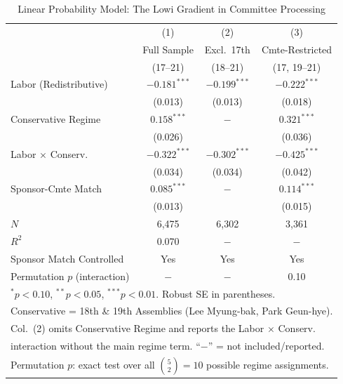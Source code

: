 \documentclass[11pt]{article}
\begin{document}
\begin{table}[H]
\centering
\caption{Linear Probability Model: The Lowi Gradient in Committee Processing}
\label{tab:main}
\begin{tabular}{lccc}
\toprule
 & (1) & (2) & (3) \\
 & Full Sample & Excl.\ 17th & Cmte-Restricted \\
 & (17--21) & (18--21) & (17, 19--21) \\
\midrule
Labor (Redistributive)  & $-0.181^{***}$ & $-0.199^{***}$ & $-0.222^{***}$ \\
                         & (0.013)        & (0.013)        & (0.018)        \\[4pt]
Conservative Regime      & $0.158^{***}$  & $-$            & $0.321^{***}$  \\
                         & (0.026)        &                & (0.036)        \\[4pt]
Labor $\times$ Conserv.  & $-0.322^{***}$ & $-0.302^{***}$ & $-0.425^{***}$ \\
                         & (0.034)        & (0.034)        & (0.042)        \\[4pt]
Sponsor-Cmte Match       & $0.085^{***}$  & $-$            & $0.114^{***}$  \\
                         & (0.013)        &                & (0.015)        \\
\midrule
$N$                      & 6,475          & 6,302          & 3,361          \\
$R^2$                    & 0.070          & $-$            & $-$            \\
Sponsor Match Controlled & Yes            & Yes            & Yes            \\
Permutation $p$ (interaction) & $-$       & $-$            & 0.10           \\
\bottomrule
\multicolumn{4}{l}{\footnotesize $^{*}p<0.10$, $^{**}p<0.05$, $^{***}p<0.01$. Robust SE in parentheses.} \\
\multicolumn{4}{l}{\footnotesize Conservative = 18th \& 19th Assemblies (Lee Myung-bak, Park Geun-hye).} \\
\multicolumn{4}{l}{\footnotesize Col.\ (2) omits Conservative Regime and reports the Labor $\times$ Conserv.} \\
\multicolumn{4}{l}{\footnotesize interaction without the main regime term. ``$-$'' = not included/reported.} \\
\multicolumn{4}{l}{\footnotesize Permutation $p$: exact test over all $\binom{5}{2} = 10$ possible regime assignments.} \\
\end{tabular}
\end{table}
\end{document}
